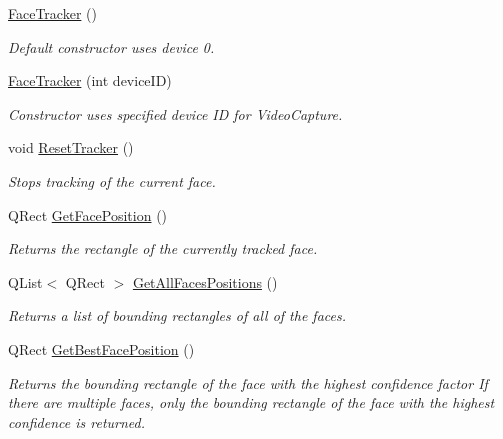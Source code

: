 \begin{DoxyCompactItemize}
\item 
\hypertarget{class_face_tracker_aae2cc94185d72854cd452485a6d00030}{\hyperlink{class_face_tracker_aae2cc94185d72854cd452485a6d00030}{Face\-Tracker} ()}\label{class_face_tracker_aae2cc94185d72854cd452485a6d00030}

\begin{DoxyCompactList}\small\item\em Default constructor uses device 0. \end{DoxyCompactList}\item 
\hyperlink{class_face_tracker_a73575602a17e08f3885f2f3596218efc}{Face\-Tracker} (int device\-I\-D)
\begin{DoxyCompactList}\small\item\em Constructor uses specified device I\-D for Video\-Capture. \end{DoxyCompactList}\item 
void \hyperlink{class_face_tracker_a37bf5c368990b1cd659b5b1c25930f13}{Reset\-Tracker} ()
\begin{DoxyCompactList}\small\item\em Stops tracking of the current face. \end{DoxyCompactList}\item 
Q\-Rect \hyperlink{class_face_tracker_a2536daf855b15610190bcedf97e2d957}{Get\-Face\-Position} ()
\begin{DoxyCompactList}\small\item\em Returns the rectangle of the currently tracked face. \end{DoxyCompactList}\item 
Q\-List$<$ Q\-Rect $>$ \hyperlink{class_face_tracker_a3b8e7cbdf61e72359cce469df98cf71e}{Get\-All\-Faces\-Positions} ()
\begin{DoxyCompactList}\small\item\em Returns a list of bounding rectangles of all of the faces. \end{DoxyCompactList}\item 
Q\-Rect \hyperlink{class_face_tracker_aff0b9cfb91df4eac94efe0cbfeae0f4f}{Get\-Best\-Face\-Position} ()
\begin{DoxyCompactList}\small\item\em Returns the bounding rectangle of the face with the highest confidence factor If there are multiple faces, only the bounding rectangle of the face with the highest confidence is returned. \end{DoxyCompactList}\item 

\end{DoxyCompactItemize}
